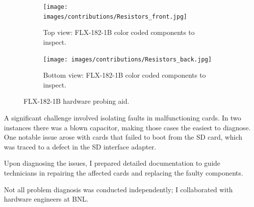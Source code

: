 \begin{figure}[H]
\centering
\begin{subfigure}[b]{\textwidth}
    \centering
    \texttt{[image: images/contributions/Resistors\_front.jpg]}
    \caption{Top view: FLX-182-1B color coded components to inspect.}
    \label{fig:FLX-182-top-resistors}
\end{subfigure}

\vspace{0.2cm}

\begin{subfigure}[b]{\textwidth}
    \centering
    \texttt{[image: images/contributions/Resistors\_back.jpg]}
    \caption{Bottom view: FLX-182-1B color coded components to inspect.}
    \label{fig:FLX-182-bot-resistors}
\end{subfigure}
\caption{FLX-182-1B hardware probing aid.}
\label{fig:FLX-182-hardware-inspection}
\end{figure}

A significant challenge involved isolating faults in malfunctioning cards. In two instances there was a blown capacitor, making those cases the easiest to diagnose. One notable issue arose with cards that failed to boot from the SD card, which was traced to a defect in the SD interface adapter.

Upon diagnosing the issues, I prepared detailed documentation to guide technicians in repairing the affected cards and replacing the faulty components.

Not all problem diagnosis was conducted independently; I collaborated with hardware engineers at \acf{BNL}.
